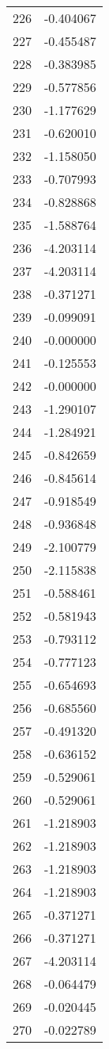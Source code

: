 \documentclass[12pt]{article}
\begin{document}
\begin{longtable}{@{}cc@{}}
226 & -0.404067 \\
227 & -0.455487 \\
228 & -0.383985 \\
229 & -0.577856 \\
230 & -1.177629 \\
231 & -0.620010 \\
232 & -1.158050 \\
233 & -0.707993 \\
234 & -0.828868 \\
235 & -1.588764 \\
236 & -4.203114 \\
237 & -4.203114 \\
238 & -0.371271 \\
239 & -0.099091 \\
240 & -0.000000 \\
241 & -0.125553 \\
242 & -0.000000 \\
243 & -1.290107 \\
244 & -1.284921 \\
245 & -0.842659 \\
246 & -0.845614 \\
247 & -0.918549 \\
248 & -0.936848 \\
249 & -2.100779 \\
250 & -2.115838 \\
251 & -0.588461 \\
252 & -0.581943 \\
253 & -0.793112 \\
254 & -0.777123 \\
255 & -0.654693 \\
256 & -0.685560 \\
257 & -0.491320 \\
258 & -0.636152 \\
259 & -0.529061 \\
260 & -0.529061 \\
261 & -1.218903 \\
262 & -1.218903 \\
263 & -1.218903 \\
264 & -1.218903 \\
265 & -0.371271 \\
266 & -0.371271 \\
267 & -4.203114 \\
268 & -0.064479 \\
269 & -0.020445 \\
270 & -0.022789 \\

\end{longtable}
\end{document}
